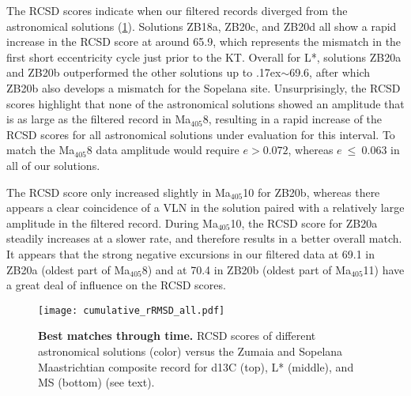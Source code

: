 \documentclass[]{agujournal2019}
\newcommand{\appr}{\raise.17ex\hbox{\(\scriptstyle\sim\)}} %
\newcommand{\ma}[1]{Ma\(_{405}\)#1} %
\newcommand{\rez}{\textcolor{magenta}}
\newcommand{\ijk}{\textcolor{blue}}
\begin{document}
The \acrfull{RCSD} scores indicate when our filtered records diverged from the astronomical solutions (\cref{fig:cum-RMSD-all}).
Solutions ZB18a, ZB20c, and ZB20d all show a rapid increase in the \gls{RCSD} score at around \qty{65.9}{\millionyearago}, which represents the mismatch in the first short eccentricity cycle just prior to the \gls{KT}.
Overall for \gls{L*}, solutions ZB20a and ZB20b outperformed the other solutions up to \appr\qty{69.6}{\millionyearago}, after which ZB20b also develops a mismatch for the Sopelana site.
Unsurprisingly, the \gls{RCSD} scores highlight that none of the astronomical solutions showed an amplitude that is as large as the filtered record in \ma{8}, resulting in a rapid increase of the \gls{RCSD} scores for all astronomical solutions under evaluation for this interval.
To match the \ma{8} data amplitude would require $e > 0.072$,
whereas $e~\le~0.063$ in all of our solutions.

The \gls{RCSD} score only increased slightly in \ma{10} for ZB20b, whereas there appears a clear coincidence of a \gls{VLN} in the solution paired with a relatively large amplitude in the filtered record.
During \ma{10}, the \gls{RCSD} score for ZB20a steadily increases at a slower rate, and therefore results in a better overall match.
It appears that the strong negative excursions in our filtered data
at \qty{69.1}{\millionyearago} in ZB20a (oldest part of \ma{8})
and at \qty{70.4}{\millionyearago} in ZB20b (oldest part of \ma{11})
have a great deal of influence on the \gls{RCSD} scores.


\begin{figure}
  \centering
  \texttt{[image: cumulative\_rRMSD\_all.pdf]}
  \caption{\label{fig:cum-RMSD-all}
    \textbf{Best matches through time.}
    \Acrfull{RCSD} scores of
    different astronomical solutions (color) versus the Zumaia and Sopelana Maastrichtian composite record
    for \gls{d13C} (top), \gls{L*} (middle), and \gls{MS} (bottom) (see text).
  }
\end{figure}
\end{document}
